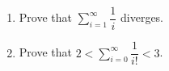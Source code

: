 \begin{enumerate}
\item[(a)] Prove that $\displaystyle\sum_{i=1}^\infty\dfrac1i$ diverges.
\item[(b)] Prove that $\displaystyle2<\sum_{i=0}^\infty\dfrac1{i!}<3$.
\end{enumerate}
